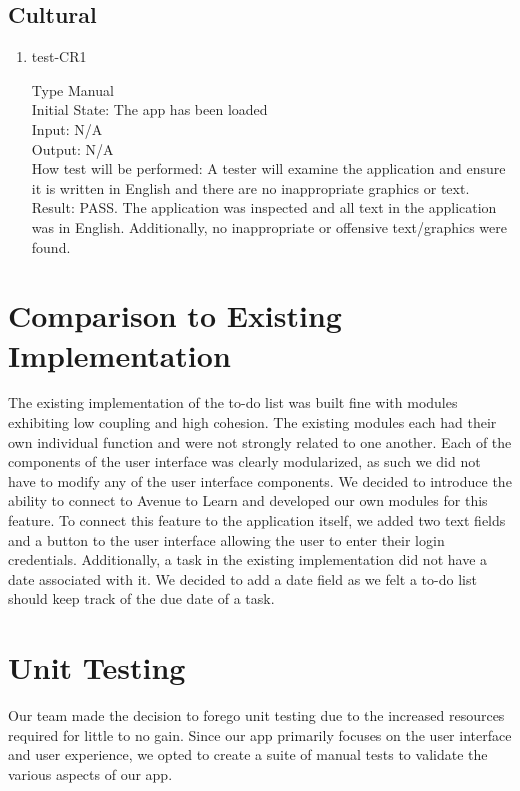 \documentclass[12pt, titlepage]{article}
\begin{document}
\subsection{Cultural}

\begin{enumerate}
\item{test-CR1\\}

Type Manual\\
Initial State: The app has been loaded\\
Input: N/A\\
Output: N/A\\
How test will be performed: A tester will examine the application and ensure it is written in English and there are no inappropriate graphics or text.\\
Result: PASS. The application was inspected and all text in the application was in English. Additionally, no inappropriate or offensive text/graphics were found.

\end{enumerate}

\section{Comparison to Existing Implementation}

The existing implementation of the to-do list was built fine with modules exhibiting low coupling and high cohesion. The existing modules each had their own individual function and were not strongly related to one another. Each of the components of the user interface was clearly modularized, as such we did not have to modify any of the user interface components. We decided to introduce the ability to connect to Avenue to Learn and developed our own modules for this feature. To connect this feature to the application itself, we added two text fields and a button to the user interface allowing the user to enter their login credentials. Additionally, a task in the existing implementation did not have a date associated with it. We decided to add a date field as we felt a to-do list should keep track of the due date of a task. 

\section{Unit Testing}

Our team made the decision to forego unit testing due to the increased resources required for little to no gain. Since our app primarily focuses on the user interface and user experience, we opted to create a suite of manual tests to validate the various aspects of our app. 
\end{document}
